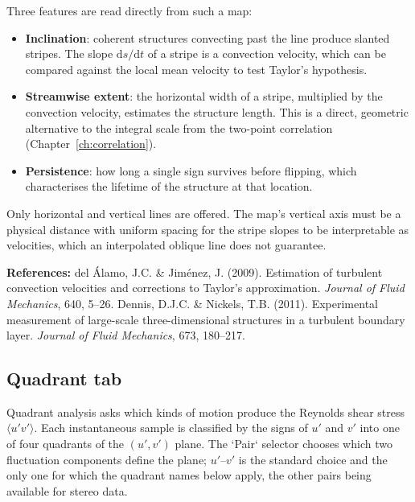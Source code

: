 Three features are read directly from such a map:

\begin{itemize}[leftmargin=1.5em]
  \item \textbf{Inclination}: coherent structures convecting past the line produce slanted stripes. The slope $\mathrm{d}s/\mathrm{d}t$ of a stripe is a convection velocity, which can be compared against the local mean velocity to test Taylor's hypothesis.
  \item \textbf{Streamwise extent}: the horizontal width of a stripe, multiplied by the convection velocity, estimates the structure length. This is a direct, geometric alternative to the integral scale from the two-point correlation (Chapter~\ref{ch:correlation}).
  \item \textbf{Persistence}: how long a single sign survives before flipping, which characterises the lifetime of the structure at that location.
\end{itemize}

Only horizontal and vertical lines are offered. The map's vertical axis must be a physical distance with uniform spacing for the stripe slopes to be interpretable as velocities, which an interpolated oblique line does not guarantee.

\noindent\textbf{References:} del \'Alamo, J.C. \& Jim\'enez, J. (2009). Estimation of turbulent convection velocities and corrections to Taylor's approximation. \textit{Journal of Fluid Mechanics}, 640, 5--26. Dennis, D.J.C. \& Nickels, T.B. (2011). Experimental measurement of large-scale three-dimensional structures in a turbulent boundary layer. \textit{Journal of Fluid Mechanics}, 673, 180--217.

\subsection{Quadrant tab}

Quadrant analysis asks which kinds of motion produce the Reynolds shear stress $\langle u'v' \rangle$. Each instantaneous sample is classified by the signs of $u'$ and $v'$ into one of four quadrants of the $(u', v')$ plane. The `Pair` selector chooses which two fluctuation components define the plane; $u'$--$v'$ is the standard choice and the only one for which the quadrant names below apply, the other pairs being available for stereo data.

